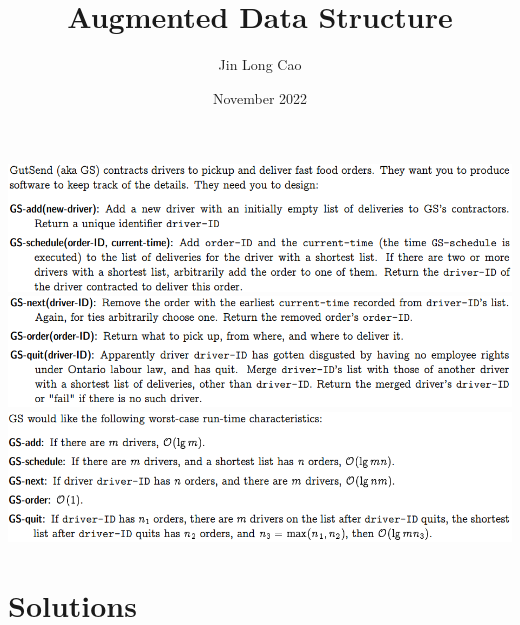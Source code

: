 \documentclass{article}
\title{Augmented Data Structure}
\author{Jin Long Cao}
\date{November 2022}
\begin{document}
\maketitle
\noindent\includegraphics[width=\textwidth]{Augmented Data Structure1}
\includegraphics[width=\textwidth]{Augmented Data Structure2}
\includegraphics[width=\textwidth]{Augmented Data Structure3}
\section*{Solutions}
\end{document}
